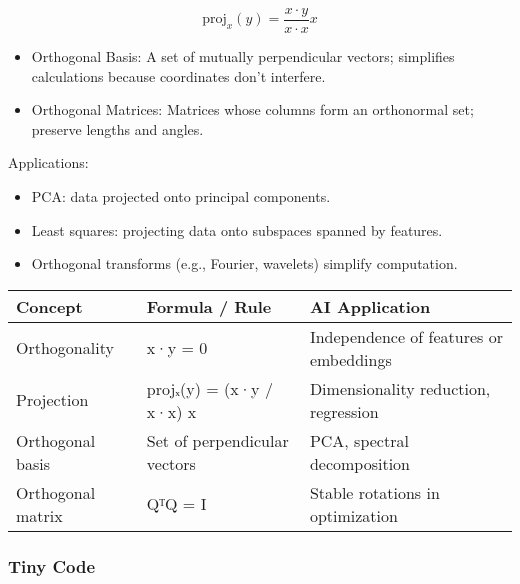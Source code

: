 \documentclass[
  letterpaper,
  DIV=11,
  numbers=noendperiod]{scrreprt}
\providecommand{\tightlist}{%
  \setlength{\itemsep}{0pt}\setlength{\parskip}{0pt}}
\begin{document}
\[
\text{proj}_x(y) = \frac{x \cdot y}{x \cdot x} x
\]

\begin{itemize}
\tightlist
\item
  Orthogonal Basis: A set of mutually perpendicular vectors; simplifies
  calculations because coordinates don't interfere.
\item
  Orthogonal Matrices: Matrices whose columns form an orthonormal set;
  preserve lengths and angles.
\end{itemize}

Applications:

\begin{itemize}
\tightlist
\item
  PCA: data projected onto principal components.
\item
  Least squares: projecting data onto subspaces spanned by features.
\item
  Orthogonal transforms (e.g., Fourier, wavelets) simplify computation.
\end{itemize}

\begin{longtable}[]{@{}
  >{\raggedright\arraybackslash}p{}
  >{\raggedright\arraybackslash}p{}
  >{\raggedright\arraybackslash}p{}@{}}
\toprule\noalign{}
\begin{minipage}[b]{\linewidth}\raggedright
Concept
\end{minipage} & \begin{minipage}[b]{\linewidth}\raggedright
Formula / Rule
\end{minipage} & \begin{minipage}[b]{\linewidth}\raggedright
AI Application
\end{minipage} \\
\midrule\noalign{}
\endhead
\bottomrule\noalign{}
\endlastfoot
Orthogonality & x·y = 0 & Independence of features or embeddings \\
Projection & projₓ(y) = (x·y / x·x) x & Dimensionality reduction,
regression \\
Orthogonal basis & Set of perpendicular vectors & PCA, spectral
decomposition \\
Orthogonal matrix & QᵀQ = I & Stable rotations in optimization \\
\end{longtable}

\subsubsection{Tiny Code}\label{tiny-code-105}
\end{document}
